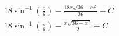 \documentclass[preview]{standalone}
\begin{document}
\begin{align*}
18\sin^{-1}(\frac{x}{6})-\frac{18x\sqrt{36-x^2}}{36} + C \\ 18\sin^{-1}(\frac{x}{6})-\frac{x\sqrt{36-x^2}}{2} + C
\end{align*}
\end{document}
